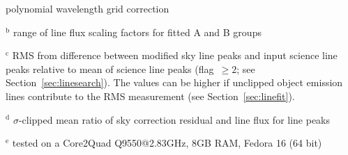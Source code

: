 \begin{table}
\begin{list}{}{}
polynomial wavelength grid correction
\item[$^\mathrm{b}$] range of line flux scaling factors for fitted A and B
groups
\item[$^\mathrm{c}$] RMS from difference between modified sky line peaks and
input science line peaks relative to mean of science line peaks (flag~$\ge 2$;
see Section~\ref{sec:linesearch}). The values can be higher if unclipped object
emission lines contribute to the RMS measurement (see
Section~\ref{sec:linefit}).
\item[$^\mathrm{d}$] $\sigma$-clipped mean ratio of sky correction residual and
line flux for line peaks
\item[$^\mathrm{e}$] tested on a Core2Quad Q9550@2.83GHz, 8GB RAM, Fedora 16
(64 bit)
\end{list}
\end{table}

